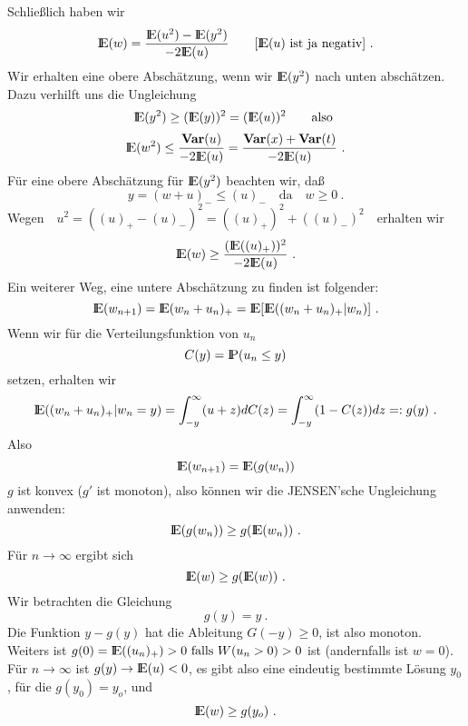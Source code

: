 Schließlich haben wir
\[{\rm I\kern-0.2em E}(w) = \frac{{\rm I\kern-0.2em E}(u^{2})-{\rm I\kern-0.2em E}(y^{2})}{-2{\rm I\kern-0.2em E}(u)} \qquad [{\rm I\kern-0.2em E}(u) \mbox{ ist ja negativ}] ~.\]
Wir erhalten eine obere Abschätzung, wenn wir ${\rm I\kern-0.2em E}(y^{2})$ nach unten abschätzen. Dazu verhilft uns die Ungleichung
\[{\rm I\kern-0.2em E}(y^{2}) \geq ({\rm I\kern-0.2em E}(y))^{2} = ({\rm I\kern-0.2em E}(u))^{2} \qquad  \mbox{also }\]
\[{\rm I\kern-0.2em E}(w^{2}) \leq \frac{{\bf Var}(u)}{-2{\rm I\kern-0.2em E}(u)} = \frac{{\bf Var}(x)+{\bf Var}(t)}{-2{\rm I\kern-0.2em E}(u)} ~.\]
Für eine obere Abschätzung für ${\rm I\kern-0.2em E}(y^{2})$ beachten wir, daß
\[y=(w+u)_{-} \leq (u)_{-} \quad \mbox{da} \quad w \geq 0 ~.\]
Wegen$ \quad u^{2} = ((u)_{+}-(u)_{-})^{2} = ((u)_{+})^{2}+((u)_{-})^{2} \quad $erhalten wir
\[{\rm I\kern-0.2em E}(w) \geq \frac{({\rm I\kern-0.2em E}((u)_{+}))^{2}}{-2{\rm I\kern-0.2em E}(u)} ~.\]
Ein weiterer Weg, eine untere Abschätzung zu finden ist folgender:
\[{\rm I\kern-0.2em E}(w_{n+1}) = {\rm I\kern-0.2em E}(w_{n}+u_{n})_{+} = {\rm I\kern-0.2em E}[{\rm I\kern-0.2em E}((w_{n}+u_{n})_{+}\vert w_{n})] ~.\]
Wenn wir für die Verteilungsfunktion von $u_{n}$
\[C(y)={\rm I\kern-0.2em P}(u_{n} \leq y)    \]
setzen, erhalten wir
\[{\rm I\kern-0.2em E}((w_{n}+u_{n})_{+} \vert w_{n} = y) = \int_{-y}^{\infty}(u+z)dC(z) = \int_{-y}^{\infty}(1-C(z))dz =: g(y) ~.\]
Also
\[{\rm I\kern-0.2em E}(w_{n+1}) = {\rm I\kern-0.2em E}(g(w_{n}))\]
$g$ ist konvex ($g'$ ist monoton), also können wir die JENSEN'sche Ungleichung anwenden:
\[{\rm I\kern-0.2em E}(g(w_{n})) \geq g({\rm I\kern-0.2em E}(w_{n}))~.\]
Für $n \rightarrow \infty$ ergibt sich
\[{\rm I\kern-0.2em E}(w) \geq g({\rm I\kern-0.2em E}(w)) ~.\]
Wir betrachten die Gleichung
\[g(y) = y ~.\]
Die Funktion $y-g(y)$ hat die Ableitung $G(-y) \geq 0$, ist also monoton.\\
Weiters ist $g(0) = {\rm I\kern-0.2em E}((u_{n})_{+}) > 0 \mbox{ falls } W(u_{n} > 0) > 0$ ist (andernfalls ist $w = 0$).\\
Für $n \rightarrow \infty$ ist $g(y) \rightarrow {\rm I\kern-0.2em E}(u) < 0$, es gibt also eine eindeutig bestimmte Lösung $y_{0}$, für die $g(y_{0}) = y_{o}$, und
\[{\rm I\kern-0.2em E}(w) \geq g(y_{o}) ~.\]

